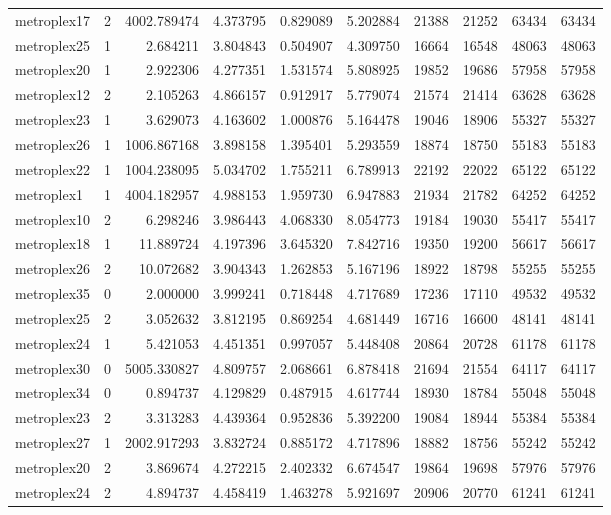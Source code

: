 \begin{longtable}{|l|r|r|r|r|r|r|r|r|r|}
metroplex17 & 2 & 4002.789474 & 4.373795 & 0.829089 & 5.202884 & 21388 & 21252 & 63434 & 63434 \\
metroplex25 & 1 & 2.684211 & 3.804843 & 0.504907 & 4.309750 & 16664 & 16548 & 48063 & 48063 \\
metroplex20 & 1 & 2.922306 & 4.277351 & 1.531574 & 5.808925 & 19852 & 19686 & 57958 & 57958 \\
metroplex12 & 2 & 2.105263 & 4.866157 & 0.912917 & 5.779074 & 21574 & 21414 & 63628 & 63628 \\
metroplex23 & 1 & 3.629073 & 4.163602 & 1.000876 & 5.164478 & 19046 & 18906 & 55327 & 55327 \\
metroplex26 & 1 & 1006.867168 & 3.898158 & 1.395401 & 5.293559 & 18874 & 18750 & 55183 & 55183 \\
metroplex22 & 1 & 1004.238095 & 5.034702 & 1.755211 & 6.789913 & 22192 & 22022 & 65122 & 65122 \\
metroplex1 & 1 & 4004.182957 & 4.988153 & 1.959730 & 6.947883 & 21934 & 21782 & 64252 & 64252 \\
metroplex10 & 2 & 6.298246 & 3.986443 & 4.068330 & 8.054773 & 19184 & 19030 & 55417 & 55417 \\
metroplex18 & 1 & 11.889724 & 4.197396 & 3.645320 & 7.842716 & 19350 & 19200 & 56617 & 56617 \\
metroplex26 & 2 & 10.072682 & 3.904343 & 1.262853 & 5.167196 & 18922 & 18798 & 55255 & 55255 \\
metroplex35 & 0 & 2.000000 & 3.999241 & 0.718448 & 4.717689 & 17236 & 17110 & 49532 & 49532 \\
metroplex25 & 2 & 3.052632 & 3.812195 & 0.869254 & 4.681449 & 16716 & 16600 & 48141 & 48141 \\
metroplex24 & 1 & 5.421053 & 4.451351 & 0.997057 & 5.448408 & 20864 & 20728 & 61178 & 61178 \\
metroplex30 & 0 & 5005.330827 & 4.809757 & 2.068661 & 6.878418 & 21694 & 21554 & 64117 & 64117 \\
metroplex34 & 0 & 0.894737 & 4.129829 & 0.487915 & 4.617744 & 18930 & 18784 & 55048 & 55048 \\
metroplex23 & 2 & 3.313283 & 4.439364 & 0.952836 & 5.392200 & 19084 & 18944 & 55384 & 55384 \\
metroplex27 & 1 & 2002.917293 & 3.832724 & 0.885172 & 4.717896 & 18882 & 18756 & 55242 & 55242 \\
metroplex20 & 2 & 3.869674 & 4.272215 & 2.402332 & 6.674547 & 19864 & 19698 & 57976 & 57976 \\
metroplex24 & 2 & 4.894737 & 4.458419 & 1.463278 & 5.921697 & 20906 & 20770 & 61241 & 61241 \\

\end{longtable}
